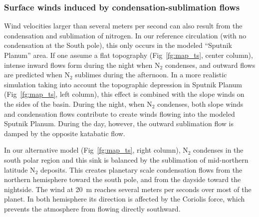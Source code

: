 \subsubsection{Surface winds induced by condensation-sublimation flows}

Wind velocities larger than several meters per second can also result from 
the condensation and sublimation of nitrogen. In our reference circulation (with no condensation at
the South pole), this only occurs in the modeled ``Sputnik Planum'' area. If one assume a flat
topography (Fig~\ref{fg:map_ts}, center column), intense inward flows form during  the night
when N$_2$ condenses, and outward flows are predicted when N$_2$ sublimes during the afternoon. In
a more realistic simulation taking into account the topographic depression in Sputnik Planum
(Fig~\ref{fg:map_ts}, left column),
this effect is combined with the slope winds on the sides of the basin. During the
night, when N$_2$ condenses, both slope winds and condensation flows contribute to create winds
flowing into the modeled Sputnik Planum. During the day, however, the outward sublimation
flow is damped by the
opposite katabatic flow. 

In our alternative model (Fig~\ref{fg:map_ts}, right column),  
N$_2$ condenses in the south polar region and this sink is
balanced by the sublimation of mid-northern latitude N$_2$ deposits. This creates planetary scale
condensation flows from the northern hemisphere toward the south pole, and from the dayside toward
the nightside. 
The wind at 20~m reaches several meters per seconds over most of the planet. In both hemisphere 
its direction is affected by the Coriolis force, which prevents the atmosphere from 
flowing directly southward.  



